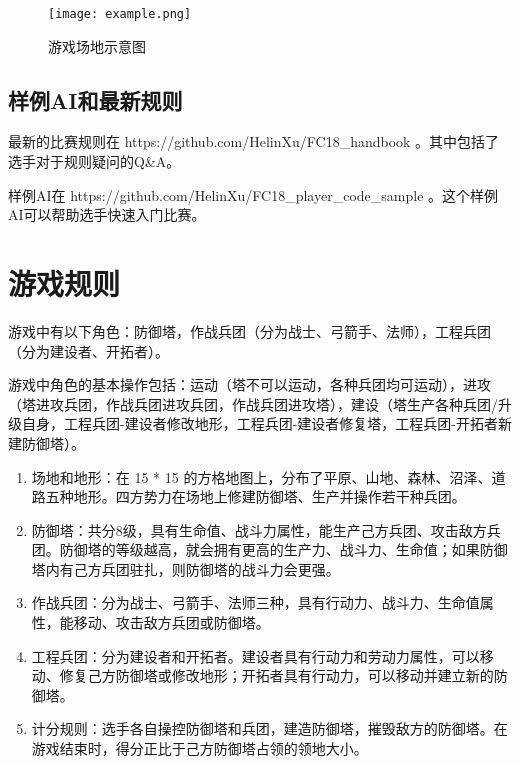\documentclass[a4paper,4pt]{article}
\begin{document}
\begin{figure}[htbp]   %
  \centering
  \texttt{[image: example.png]}
  \caption{游戏场地示意图}
  \label{jpg:示例图片1}
\end{figure}

\subsection{样例AI和最新规则}

最新的比赛规则在 https://github.com/HelinXu/FC18\_handbook 。其中包括了选手对于规则疑问的Q\&A。\par
样例AI在 https://github.com/HelinXu/FC18\_player\_code\_sample 。这个样例AI可以帮助选手快速入门比赛。\par


\section{游戏规则}
游戏中有以下角色：防御塔，作战兵团（分为战士、弓箭手、法师），工程兵团（分为建设者、开拓者）。\par
游戏中角色的基本操作包括：运动（塔不可以运动，各种兵团均可运动），进攻（塔进攻兵团，作战兵团进攻兵团，作战兵团进攻塔），建设（塔生产各种兵团/升级自身，工程兵团-建设者修改地形，工程兵团-建设者修复塔，工程兵团-开拓者新建防御塔）。
\begin{enumerate}[fullwidth, itemindent=2em, label=(\arabic*)]
  \item 场地和地形：在 15 * 15 的方格地图上，分布了平原、山地、森林、沼泽、道路五种地形。四方势力在场地上修建防御塔、生产并操作若干种兵团。
  \item 防御塔：共分8级，具有生命值、战斗力属性，能生产己方兵团、攻击敌方兵团。防御塔的等级越高，就会拥有更高的生产力、战斗力、生命值；如果防御塔内有己方兵团驻扎，则防御塔的战斗力会更强。
  \item 作战兵团：分为战士、弓箭手、法师三种，具有行动力、战斗力、生命值属性，能移动、攻击敌方兵团或防御塔。
  \item 工程兵团：分为建设者和开拓者。建设者具有行动力和劳动力属性，可以移动、修复己方防御塔或修改地形；开拓者具有行动力，可以移动并建立新的防御塔。
  \item 计分规则：选手各自操控防御塔和兵团，建造防御塔，摧毁敌方的防御塔。在游戏结束时，得分正比于己方防御塔占领的领地大小。
\end{enumerate}
\par
\end{document}
